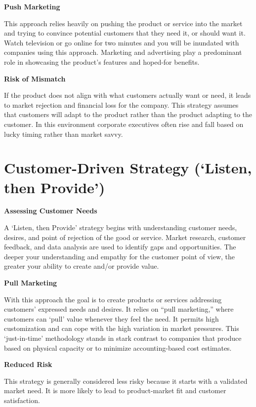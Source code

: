 \documentclass[
]{book}
\begin{document}
\textbf{Push Marketing}

This approach relies heavily on pushing the product or service into the market and trying to convince potential customers that they need it, or should want it. Watch television or go online for two minutes and you will be inundated with companies using this approach. Marketing and advertising play a predominant role in showcasing the product's features and hoped-for benefits.

\textbf{Risk of Mismatch}

If the product does not align with what customers actually want or need, it leads to market rejection and financial loss for the company. This strategy assumes that customers will adapt to the product rather than the product adapting to the customer. In this environment corporate executives often rise and fall based on lucky timing rather than market savvy.

\hypertarget{customer-driven-strategy-listen-then-provide}{%
\section{\texorpdfstring{\textbf{Customer-Driven Strategy ({`Listen, then Provide'})}}{Customer-Driven Strategy (`Listen, then Provide')}}\label{customer-driven-strategy-listen-then-provide}}

\textbf{Assessing Customer Needs}

A {`Listen, then Provide'} strategy begins with understanding customer needs, desires, and point of rejection of the good or service. Market research, customer feedback, and data analysis are used to identify gaps and opportunities. The deeper your understanding and empathy for the customer point of view, the greater your ability to create and/or provide value.

\textbf{Pull Marketing}

With this approach the goal is to create products or services addressing customers' expressed needs and desires. It relies on ``pull marketing,'' where customers can `pull' value whenever they feel the need. It permits high customization and can cope with the high variation in market pressures. This `just-in-time' methodology stands in stark contrast to companies that produce based on physical capacity or to minimize accounting-based cost estimates.

\textbf{Reduced Risk}

This strategy is generally considered less risky because it starts with a validated market need. It is more likely to lead to product-market fit and customer satisfaction.
\end{document}
